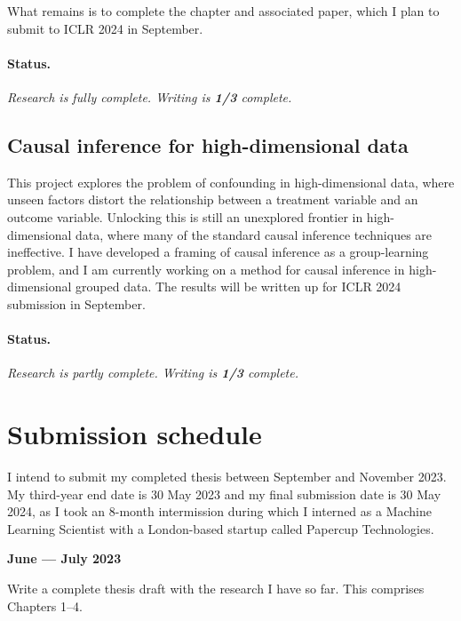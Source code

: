 \documentclass[a4paper]{article}
\begin{document}
What remains is to complete the chapter and associated paper, which I plan to submit to ICLR 2024 in September.

\paragraph{Status.} \textit{Research is fully complete. Writing is \textbf{1/3} complete.}

\subsection{Causal inference for high-dimensional data}

This project explores the problem of confounding in high-dimensional data, where unseen factors distort the relationship between a treatment variable and an outcome variable. Unlocking this is still an unexplored frontier in high-dimensional data, where many of the standard causal inference techniques are ineffective. I have developed a framing of causal inference as a group-learning problem, and I am currently working on a method for causal inference in high-dimensional grouped data. The results will be written up for ICLR 2024 submission in September.

\paragraph{Status.} \textit{Research is partly complete. Writing is \textbf{1/3} complete.}

\section{Submission schedule}

I intend to submit my completed thesis between September and November 2023. My third-year end date is 30 May 2023 and my final submission date is 30 May 2024, as I took an 8-month intermission during which I interned as a Machine Learning Scientist with a London-based startup called Papercup Technologies.

\vspace{1em}

\noindent\begin{minipage}[t]{0.33\textwidth}
    \textbf{June --- July 2023}
\end{minipage}
\hfill
\begin{minipage}[t]{0.66\textwidth}
    Write a complete thesis draft with the research I have so far. This comprises Chapters 1--4. 
\end{minipage}
\end{document}
